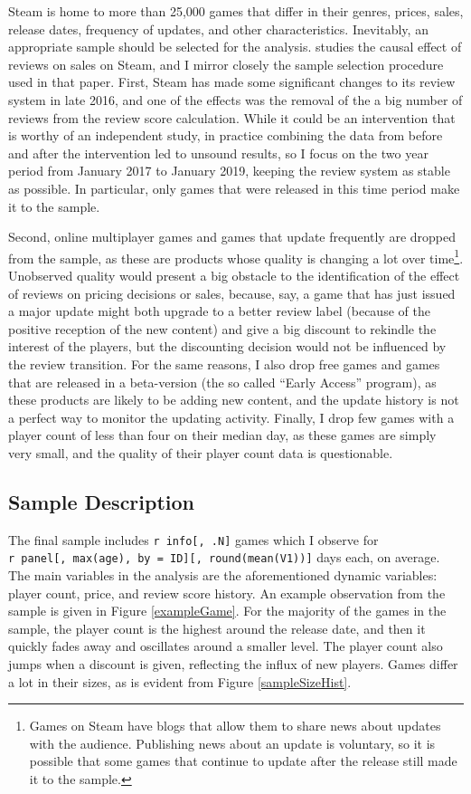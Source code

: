 \documentclass[
  12pt,
  pagebackref]{article}
\begin{document}
Steam is home to more than 25,000 games that differ in their genres,
prices, sales, release dates, frequency of updates, and other
characteristics. Inevitably, an appropriate sample should be selected
for the analysis. \citet{SorokinStevens20} studies the causal effect of
reviews on sales on Steam, and I mirror closely the sample selection
procedure used in that paper. First, Steam has made some significant
changes to its review system in late 2016, and one of the effects was
the removal of the a big number of reviews from the review score
calculation. While it could be an intervention that is worthy of an
independent study, in practice combining the data from before and after
the intervention led to unsound results, so I focus on the two year
period from January 2017 to January 2019, keeping the review system as
stable as possible. In particular, only games that were released in this
time period make it to the sample.

Second, online multiplayer games and games that update frequently are
dropped from the sample, as these are products whose quality is changing
a lot over
time\footnote{Games on Steam have blogs that allow them to share news about updates with the audience. Publishing news about an update is voluntary, so it is possible that some games that continue to update after the release still made it to the sample.}.
Unobserved quality would present a big obstacle to the identification of
the effect of reviews on pricing decisions or sales, because, say, a
game that has just issued a major update might both upgrade to a better
review label (because of the positive reception of the new content) and
give a big discount to rekindle the interest of the players, but the
discounting decision would not be influenced by the review transition.
For the same reasons, I also drop free games and games that are released
in a beta-version (the so called ``Early Access'' program), as these
products are likely to be adding new content, and the update history is
not a perfect way to monitor the updating activity. Finally, I drop few
games with a player count of less than four on their median day, as
these games are simply very small, and the quality of their player count
data is questionable.

\hypertarget{sample-description}{%
\subsection{Sample Description}\label{sample-description}}

The final sample includes \texttt{r\ info{[},\ .N{]}} games which I
observe for
\texttt{r\ panel{[},\ max(age),\ by\ =\ ID{]}{[},\ round(mean(V1)){]}}
days each, on average. The main variables in the analysis are the
aforementioned dynamic variables: player count, price, and review score
history. An example observation from the sample is given in Figure
\ref{exampleGame}. For the majority of the games in the sample, the
player count is the highest around the release date, and then it quickly
fades away and oscillates around a smaller level. The player count also
jumps when a discount is given, reflecting the influx of new players.
Games differ a lot in their sizes, as is evident from Figure
\ref{sampleSizeHist}.
\end{document}
